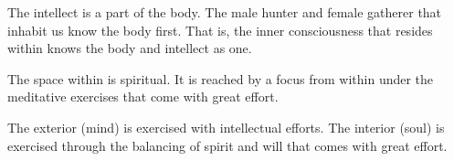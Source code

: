 

The intellect is a part of the body.  The male hunter and female
gatherer that inhabit us know the body first.  That is, the inner
consciousness that resides within knows the body and intellect as one.

The space within is spiritual.  It is reached by a focus from within
under the meditative exercises that come with great effort.  

The exterior (mind) is exercised with intellectual efforts.  The
interior (soul) is exercised through the balancing of spirit and will
that comes with great effort.

\bye
